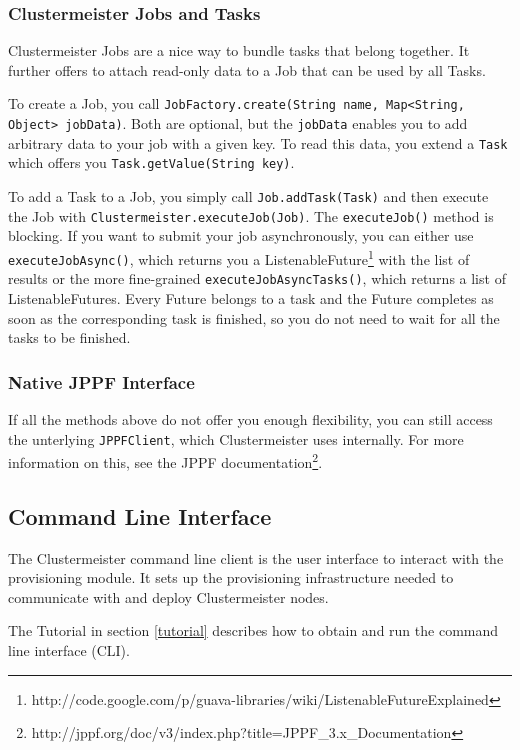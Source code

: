 \subsubsection{Clustermeister Jobs and Tasks}

Clustermeister Jobs are a nice way to bundle tasks that belong together. It further offers to attach read-only data to a Job that can be used by all Tasks.

To create a Job, you call \texttt{JobFactory.create(String name, Map<String, Object> jobData)}. Both are optional, but the \texttt{jobData} enables you to add arbitrary data to your job with a given key. To read this data, you extend a \texttt{Task} which offers you \texttt{Task.getValue(String key)}.

To add a Task to a Job, you simply call \texttt{Job.addTask(Task)} and then execute the Job with \texttt{Clustermeister.executeJob(Job)}. The \texttt{executeJob()} method is blocking. If you want to submit your job asynchronously, you can either use \texttt{executeJobAsync()}, which returns you a ListenableFuture\footnote{http://code.google.com/p/guava-libraries/wiki/ListenableFutureExplained} with the list of results or the more fine-grained \texttt{executeJobAsyncTasks()}, which returns a list of ListenableFutures. Every Future belongs to a task and the Future completes as soon as the corresponding task is finished, so you do not need to wait for all the tasks to be finished.

\subsubsection{Native JPPF Interface}

If all the methods above do not offer you enough flexibility, you can still access the unterlying \texttt{JPPFClient}, which Clustermeister uses internally. For more information on this, see the JPPF documentation\footnote{http://jppf.org/doc/v3/index.php?title=JPPF\_3.x\_Documentation}.

\subsection{Command Line Interface}

The Clustermeister command line client is the user interface to interact with the provisioning module. It sets up the provisioning infrastructure needed to communicate with and deploy Clustermeister nodes.

The Tutorial in section \ref{tutorial} describes how to obtain and run the command line interface (CLI).

